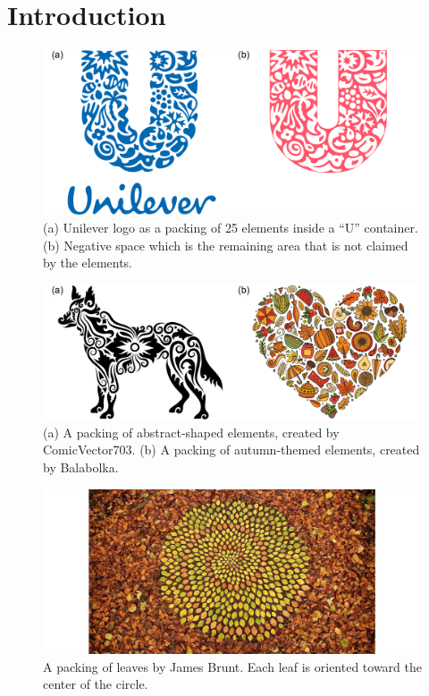 
\chapter{Introduction}
\label{chapter_introduction}

\begin{figure}
\centering
\includegraphics[width=1.0\textwidth]{figures/intro/unilever_w_neg_space.pdf} 
\caption[Unilever logo]
{\label{fig_logo_packing} 
(a) Unilever logo as a packing of 25 elements inside a ``U'' container. 
(b) Negative space which is the remaining area that is not claimed by the elements. }
\end{figure}

\begin{figure}
\centering
\includegraphics[width=1.0\textwidth]{figures/intro/balabolka_dog_flow.pdf} 
\caption[Packings in graphic design]
{\label{fig_graphic_designs} 
(a) A packing of abstract-shaped elements, created by ComicVector703.
(b) A packing of autumn-themed elements, created by Balabolka.  }
\end{figure}

\begin{figure}
\centering
\includegraphics[width=1.0\textwidth]{figures/intro/woodland.jpg} 
\caption[Packing in art]
{\label{fig_woodland} 
A packing of leaves by James Brunt. Each leaf is oriented toward the center of the circle. }
\end{figure}

